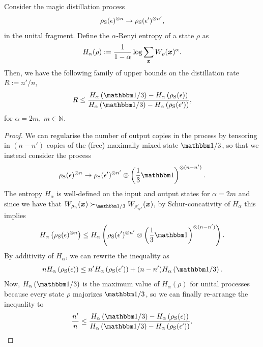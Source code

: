 \documentclass[pra,
aps,
twocolumn,
superscriptaddress,
groupedaddress,
nofootinbib,
reprint
]{revtex4-1}
\begin{document}
\begin{theorem}
	Consider the magic distillation process
	\begin{equation}
		\rho_{\rm{S}}(\epsilon)^{\otimes n} \rightarrow \rho_{\rm{S}}(\epsilon')^{\otimes n'},
	\end{equation}
	in the unital fragment.
	Define the $\alpha$-Renyi entropy of a state $\rho$ as
	\begin{equation}
		H_{\alpha}(\rho) := \frac{1}{1-\alpha} \log \sum_{\bm{x}} W_{\rho}(\bm{x})^\alpha.
	\end{equation}
	Then, we have the following family of upper bounds on the distillation rate $R := n'/n$,
	\begin{equation}
		R \leq \frac{H_\alpha \left( \id/3 \right) - H_\alpha \left( \rho_{\rm{S}}(\epsilon) \right)}{H_\alpha \left( \id/3 \right) - H_\alpha \left( \rho_{\rm{S}}(\epsilon') \right)},
	\end{equation}
	for $\alpha = 2m,\ m\in\mathbb{N}$.
\end{theorem}
\begin{proof}
	We can regularise the number of output copies in the process by tensoring in $(n-n')$ copies of the (free) maximally mixed state $\id/3$, so that we instead consider the process
\begin{equation}
	\rho_{\rm{S}}(\epsilon)^{\otimes n} \rightarrow \rho_{\rm{S}}(\epsilon')^{\otimes n'} \otimes \left( \frac{1}{3}\id \right)^{\otimes (n - n')}.
\end{equation}
The entropy $H_\alpha$ is well-defined on the input and output states for $\alpha = 2m$ and since we have that $W_{\rho_n}(\bmx) \succ_{\id/3} W_{\rho'_{n'}}(\bmx)$, by Schur-concativity of $H_\alpha$ this implies
\begin{equation}
	H_\alpha \left( \rho_{\rm{S}}(\epsilon)^{\otimes n} \right) \leq H_\alpha \left( \rho_{\rm{S}}(\epsilon')^{\otimes n'} \otimes \left( \frac{1}{3}\id \right)^{\otimes (n - n')} \right).
\end{equation}
By additivity of $H_\alpha$, we can rewrite the inequality as
\begin{equation}
	n H_\alpha \left( \rho_{\rm{S}}(\epsilon) \right) \leq n' H_\alpha \left( \rho_{\rm{S}}(\epsilon') \right) + (n - n') H_\alpha \left( \id/3 \right).
\end{equation}
Now, $H_\alpha \left( \id/3 \right)$ is the maximum value of $H_\alpha(\rho)$ for unital processes because every state $\rho$ majorizes $\id/3$, so we can finally re-arrange the inequality to
\begin{equation}
	\frac{n'}{n} \leq \frac{H_\alpha \left( \id/3 \right) - H_\alpha \left( \rho_{\rm{S}}(\epsilon) \right)}{H_\alpha \left( \id/3 \right) - H_\alpha \left( \rho_{\rm{S}}(\epsilon') \right)}.
\end{equation}
\end{proof}
\end{document}
